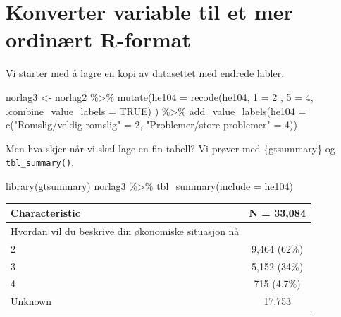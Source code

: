 \documentclass[
  letterpaper,
  DIV=11,
  numbers=noendperiod]{scrreprt}
\newenvironment{Shaded}{\begin{snugshade}}{\end{snugshade}}
\newcommand{\AttributeTok}[1]{\textcolor[rgb]{0.40,0.45,0.13}{#1}}
\newcommand{\ConstantTok}[1]{\textcolor[rgb]{0.56,0.35,0.01}{#1}}
\newcommand{\DecValTok}[1]{\textcolor[rgb]{0.68,0.00,0.00}{#1}}
\newcommand{\FunctionTok}[1]{\textcolor[rgb]{0.28,0.35,0.67}{#1}}
\newcommand{\NormalTok}[1]{\textcolor[rgb]{0.00,0.23,0.31}{#1}}
\newcommand{\OtherTok}[1]{\textcolor[rgb]{0.00,0.23,0.31}{#1}}
\newcommand{\SpecialCharTok}[1]{\textcolor[rgb]{0.37,0.37,0.37}{#1}}
\newcommand{\StringTok}[1]{\textcolor[rgb]{0.13,0.47,0.30}{#1}}
\begin{document}
\hypertarget{konverter-variable-til-et-mer-ordinuxe6rt-r-format}{%
\section{Konverter variable til et mer ordinært
R-format}\label{konverter-variable-til-et-mer-ordinuxe6rt-r-format}}

Vi starter med å lagre en kopi av datasettet med endrede labler.

\begin{Shaded}
\begin{Highlighting}[]
\NormalTok{norlag3 }\OtherTok{\textless{}{-}}\NormalTok{ norlag2 }\SpecialCharTok{\%\textgreater{}\%} 
  \FunctionTok{mutate}\NormalTok{(}\AttributeTok{he104 =} \FunctionTok{recode}\NormalTok{(he104, }
                          \StringTok{\textasciigrave{}}\AttributeTok{1}\StringTok{\textasciigrave{}} \OtherTok{=} \DecValTok{2}\NormalTok{ ,}
                          \StringTok{\textasciigrave{}}\AttributeTok{5}\StringTok{\textasciigrave{}} \OtherTok{=} \DecValTok{4}\NormalTok{,}
                        \AttributeTok{.combine\_value\_labels =} \ConstantTok{TRUE}\NormalTok{) ) }\SpecialCharTok{\%\textgreater{}\%} 
  \FunctionTok{add\_value\_labels}\NormalTok{(}\AttributeTok{he104 =} \FunctionTok{c}\NormalTok{(}\StringTok{"Romslig/veldig romslig"} \OtherTok{=} \DecValTok{2}\NormalTok{, }
                             \StringTok{"Problemer/store problemer"} \OtherTok{=} \DecValTok{4}\NormalTok{))}
\end{Highlighting}
\end{Shaded}

Men hva skjer når vi skal lage en fin tabell? Vi prøver med
\{gtsummary\} og \texttt{tbl\_summary()}.

\begin{Shaded}
\begin{Highlighting}[]
\FunctionTok{library}\NormalTok{(gtsummary)}
\NormalTok{norlag3 }\SpecialCharTok{\%\textgreater{}\%} 
  \FunctionTok{tbl\_summary}\NormalTok{(}\AttributeTok{include =}\NormalTok{ he104)}
\end{Highlighting}
\end{Shaded}

\begin{longtable}[]{@{}lc@{}}
\toprule()
\textbf{Characteristic} & \textbf{N = 33,084} \\
\midrule()
\endhead
Hvordan vil du beskrive din økonomiske situasjon nå & \\
2 & 9,464 (62\%) \\
3 & 5,152 (34\%) \\
4 & 715 (4.7\%) \\
Unknown & 17,753 \\
\bottomrule()
\end{longtable}
\end{document}
